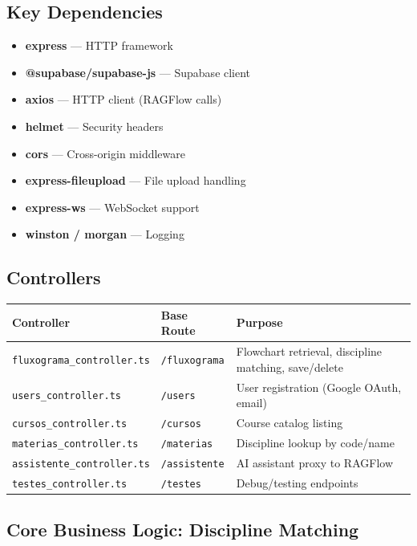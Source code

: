 \documentclass[11pt,a4paper]{article}
\newcommand{\code}[1]{\texttt{#1}}
\begin{document}
\subsection{Key Dependencies}
\begin{itemize}[noitemsep]
    \item \textbf{express} — HTTP framework
    \item \textbf{@supabase/supabase-js} — Supabase client
    \item \textbf{axios} — HTTP client (RAGFlow calls)
    \item \textbf{helmet} — Security headers
    \item \textbf{cors} — Cross-origin middleware
    \item \textbf{express-fileupload} — File upload handling
    \item \textbf{express-ws} — WebSocket support
    \item \textbf{winston / morgan} — Logging
\end{itemize}

\subsection{Controllers}

\begin{center}
\begin{longtable}{@{}L{4.2cm}L{2.8cm}L{6cm}@{}}
\toprule
\textbf{Controller} & \textbf{Base Route} & \textbf{Purpose} \\
\midrule
\endhead
\code{fluxograma\_controller.ts}  & \code{/fluxograma}  & Flowchart retrieval, discipline matching, save/delete \\
\code{users\_controller.ts}       & \code{/users}       & User registration (Google OAuth, email) \\
\code{cursos\_controller.ts}      & \code{/cursos}      & Course catalog listing \\
\code{materias\_controller.ts}    & \code{/materias}    & Discipline lookup by code/name \\
\code{assistente\_controller.ts}  & \code{/assistente}  & AI assistant proxy to RAGFlow \\
\code{testes\_controller.ts}      & \code{/testes}      & Debug/testing endpoints \\
\bottomrule
\end{longtable}
\end{center}

\subsection{Core Business Logic: Discipline Matching}
\end{document}
